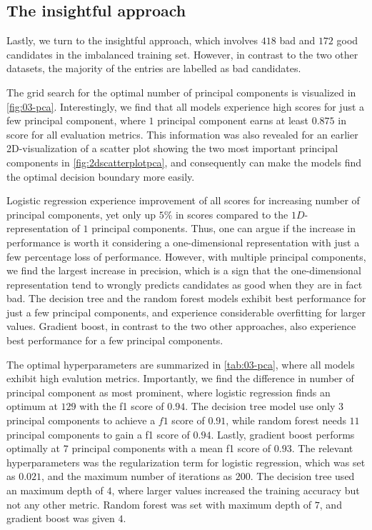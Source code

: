 \subsection{The insightful approach}

Lastly, we turn to the insightful approach, which involves $418$ bad and $172$ good candidates in the imbalanced training set. However, in contrast to the two other datasets, the majority of the entries are labelled as bad candidates.

The grid search for the optimal number of principal components is visualized in \autoref{fig:03-pca}. Interestingly, we find that all models experience high scores for just a few principal component, where $1$ principal component earns at least $0.875$ in score for all evaluation metrics. This information was also revealed for an earlier 2D-visualization of a scatter plot showing the two most important principal components in \autoref{fig:2dscatterplotpca}, and consequently can make the models find the optimal decision boundary more easily.

Logistic regression experience improvement of all scores for increasing number of principal components, yet only up $5\%$ in scores compared to the $1D$-representation of $1$ principal components. Thus, one can argue if the increase in performance is worth it considering a one-dimensional representation with just a few percentage loss of performance. However, with multiple principal components, we find the largest increase in precision, which is a sign that the one-dimensional representation tend to wrongly predicts candidates as good when they are in fact bad. The decision tree and the random forest models exhibit best performance for just a few principal components, and experience considerable overfitting for larger values. Gradient boost, in contrast to the two other approaches, also experience best performance for a few principal components.

The optimal hyperparameters are summarized in \autoref{tab:03-pca}, where all models exhibit high evalution metrics. Importantly, we find the difference in number of principal component as most prominent, where logistic regression finds an optimum at $129$ with the f1 score of $0.94$. The decision tree model use only $3$ principal components to achieve a $f1$ score of $0.91$, while random forest needs $11$ principal components to gain a f1 score of $0.94$. Lastly, gradient boost performs optimally at $7$ principal components with a mean f1 score of $0.93$. The relevant hyperparameters was the regularization term for logistic regression, which was set as $0.021$, and the maximum number of iterations as $200$. The decision tree used an maximum depth of $4$, where larger values increased the training accuracy but not any other metric. Random forest was set with maximum depth of $7$, and gradient boost was given $4$.

